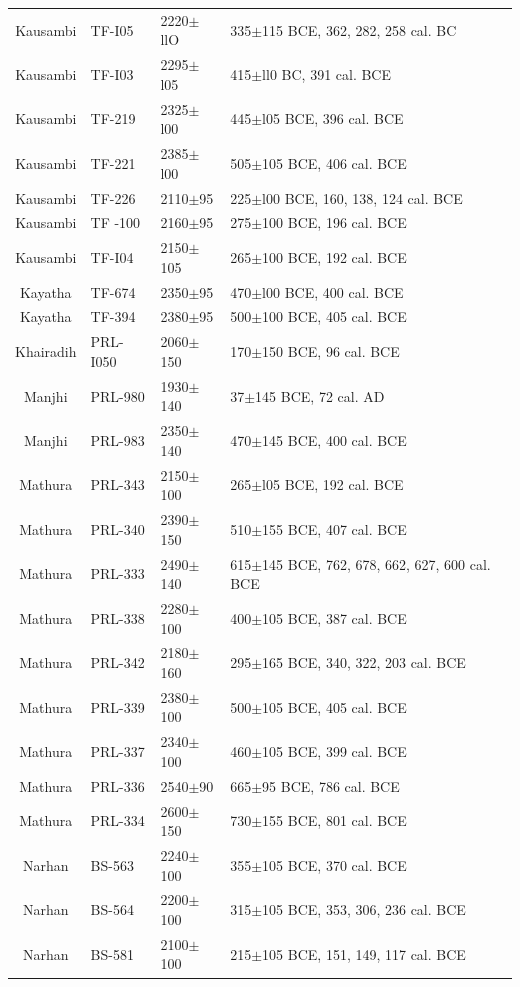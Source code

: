 {{{\begin{longtable}{|c|p{1.1cm}|p{1.2cm}|p{1.8cm}|p{3.3cm}|}
Kausambi & TF-I05 & 2220$\pm$llO & 335$\pm$115 BCE, 362, 282, 258 cal. BC & \\
Kausambi & TF-I03 & 2295$\pm$l05 & 415$\pm$ll0 BC, 391 cal. BCE &\\
Kausambi & TF-219 & 2325$\pm$l00 & 445$\pm$l05 BCE, 396 cal. BCE &\\
Kausambi & TF-221 & 2385$\pm$l00 & 505$\pm$105 BCE, 406 cal. BCE &\\
Kausambi & TF-226 & 2110$\pm$95 & 225$\pm$l00 BCE, 160, 138, 124 cal. BCE &\\
Kausambi & TF -100 & 2160$\pm$95 & 275$\pm$100 BCE, 196 cal. BCE & \\
Kausambi & TF-I04 & 2150$\pm$105 & 265$\pm$100 BCE, 192 cal. BCE &\\
Kayatha & TF-674 & 2350$\pm$95 & 470$\pm$l00 BCE, 400 cal. BCE &\\
Kayatha & TF-394 & 2380$\pm$95 & 500$\pm$100 BCE, 405 cal. BCE & \\
Khairadih & PRL-I050 & 2060$\pm$150 & 170$\pm$150 BCE, 96 cal. BCE & \\
Manjhi & PRL-980 & 1930$\pm$140 & 37$\pm$145 BCE, 72 cal. AD &\\
Manjhi & PRL-983 & 2350$\pm$140 & 470$\pm$145 BCE, 400 cal. BCE & \\
Mathura & PRL-343 & 2150$\pm$100 & 265$\pm$l05 BCE, 192 cal. BCE &\\
Mathura & PRL-340 & 2390$\pm$150 & 510$\pm$155 BCE, 407 cal. BCE& \\
Mathura & PRL-333 & 2490$\pm$140 & 615$\pm$145 BCE, 762, 678, 662, 627, 600 cal. BCE &\\
Mathura & PRL-338 & 2280$\pm$100 & 400$\pm$105 BCE, 387 cal. BCE &\\
Mathura & PRL-342 & 2180$\pm$160 & 295$\pm$165 BCE, 340, 322, 203 cal. BCE & \\
Mathura & PRL-339 & 2380$\pm$100 & 500$\pm$105 BCE, 405 cal. BCE &\\
Mathura & PRL-337 & 2340$\pm$100 & 460$\pm$105 BCE, 399 cal. BCE &\\
Mathura & PRL-336 & 2540$\pm$90 & 665$\pm$95 BCE, 786 cal. BCE &\\
Mathura & PRL-334 & 2600$\pm$150 & 730$\pm$155 BCE, 801 cal. BCE & \\
Narhan & BS-563 & 2240$\pm$100 & 355$\pm$105 BCE, 370 cal. BCE & \\
Narhan & BS-564 & 2200$\pm$100 & 315$\pm$105 BCE, 353, 306, 236 cal. BCE & \\
Narhan & BS-581 & 2100$\pm$100 & 215$\pm$105 BCE, 151, 149, 117 cal. BCE & \\

\end{longtable}}}}
